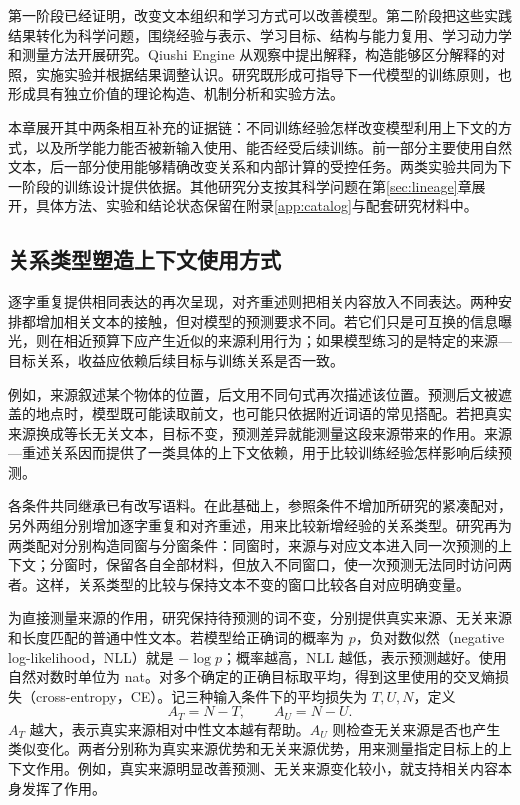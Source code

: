\label{sec:principles}

第一阶段已经证明，改变文本组织和学习方式可以改善模型。第二阶段把这些实践结果转化为科学问题，围绕经验与表示、学习目标、结构与能力复用、学习动力学和测量方法开展研究。Qiushi Engine 从观察中提出解释，构造能够区分解释的对照，实施实验并根据结果调整认识。研究既形成可指导下一代模型的训练原则，也形成具有独立价值的理论构造、机制分析和实验方法。

本章展开其中两条相互补充的证据链：不同训练经验怎样改变模型利用上下文的方式，以及所学能力能否被新输入使用、能否经受后续训练。前一部分主要使用自然文本，后一部分使用能够精确改变关系和内部计算的受控任务。两类实验共同为下一阶段的训练设计提供依据。其他研究分支按其科学问题在第\ref{sec:lineage}章展开，具体方法、实验和结论状态保留在附录\ref{app:catalog}与配套研究材料中。

\subsection{关系类型塑造上下文使用方式}
\label{sec:relation}

逐字重复提供相同表达的再次呈现，对齐重述则把相关内容放入不同表达。两种安排都增加相关文本的接触，但对模型的预测要求不同。若它们只是可互换的信息曝光，则在相近预算下应产生近似的来源利用行为；如果模型练习的是特定的来源—目标关系，收益应依赖后续目标与训练关系是否一致。

例如，来源叙述某个物体的位置，后文用不同句式再次描述该位置。预测后文被遮盖的地点时，模型既可能读取前文，也可能只依据附近词语的常见搭配。若把真实来源换成等长无关文本，目标不变，预测差异就能测量这段来源带来的作用。来源—重述关系因而提供了一类具体的上下文依赖，用于比较训练经验怎样影响后续预测。

各条件共同继承已有改写语料。在此基础上，参照条件不增加所研究的紧凑配对，另外两组分别增加逐字重复和对齐重述，用来比较新增经验的关系类型。研究再为两类配对分别构造同窗与分窗条件：同窗时，来源与对应文本进入同一次预测的上下文；分窗时，保留各自全部材料，但放入不同窗口，使一次预测无法同时访问两者。这样，关系类型的比较与保持文本不变的窗口比较各自对应明确变量。

为直接测量来源的作用，研究保持待预测的词不变，分别提供真实来源、无关来源和长度匹配的普通中性文本。若模型给正确词的概率为 $p$，负对数似然（negative log-likelihood，NLL）就是 $-\log p$；概率越高，NLL 越低，表示预测越好。使用自然对数时单位为 nat。对多个确定的正确目标取平均，得到这里使用的交叉熵损失（cross-entropy，CE）。记三种输入条件下的平均损失为 $T,U,N$，定义
\begin{equation}
 A_T=N-T,\qquad A_U=N-U.
\label{eq:source_advantage}
\end{equation}
$A_T$ 越大，表示真实来源相对中性文本越有帮助。$A_U$ 则检查无关来源是否也产生类似变化。两者分别称为真实来源优势和无关来源优势，用来测量指定目标上的上下文作用。例如，真实来源明显改善预测、无关来源变化较小，就支持相关内容本身发挥了作用。

